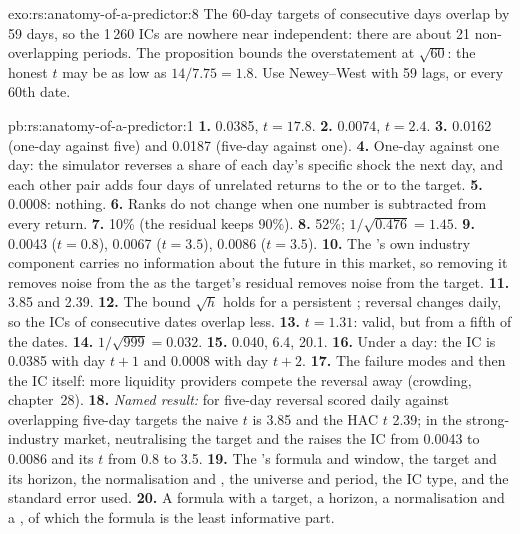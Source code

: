 \begin{solution}{exo:rs:anatomy-of-a-predictor:8}
The 60-day targets of consecutive days overlap by 59 days, so the 1\,260 ICs are nowhere near independent: there are about 21
non-overlapping periods. The proposition bounds the overstatement at $\sqrt{60}$: the honest $t$ may be as low as $14/7.75 = 1.8$. Use
Newey--West with 59 lags, or every 60th date.
\end{solution}

\begin{solution}{pb:rs:anatomy-of-a-predictor:1}
\textbf{1.} 0.0385, $t = 17.8$. \textbf{2.} 0.0074, $t = 2.4$. \textbf{3.} 0.0162 (one-day against five) and 0.0187 (five-day against
one). \textbf{4.} One-day against one day: the simulator reverses a share of each day's specific shock the next day, and each other
pair adds four days of unrelated returns to the  or to the target. \textbf{5.} 0.0008: nothing. \textbf{6.} Ranks do not change
when one number is subtracted from every return. \textbf{7.} 10\% (the residual keeps 90\%). \textbf{8.} 52\%; $1/\sqrt{0.476} = 1.45$.
\textbf{9.} 0.0043 ($t = 0.8$), 0.0067 ($t = 3.5$), 0.0086 ($t = 3.5$). \textbf{10.} The 's own industry component carries no
information about the future in this market, so removing it removes noise from the  as the target's residual removes noise
from the target. \textbf{11.} 3.85 and 2.39. \textbf{12.} The bound $\sqrt h$ holds for a persistent ; reversal changes daily, so
the ICs of consecutive dates overlap less. \textbf{13.} $t = 1.31$: valid, but from a fifth of the dates. \textbf{14.} $1/\sqrt{999} =
0.032$. \textbf{15.} 0.040, 6.4, 20.1. \textbf{16.} Under a day: the IC is 0.0385 with day $t+1$ and 0.0008 with day $t+2$.
\textbf{17.} The failure modes and then the IC itself: more liquidity providers compete the reversal away (crowding, chapter~28).
\textbf{18.} \emph{Named result:} for five-day reversal scored daily against overlapping five-day targets the naive $t$ is 3.85 and the
HAC $t$ 2.39; in the strong-industry market, neutralising the target and the  raises the IC from 0.0043 to 0.0086 and its $t$
from 0.8 to 3.5. \textbf{19.} The 's formula and window, the target and its horizon, the normalisation and ,
the universe and period, the IC type, and the standard error used. \textbf{20.} A formula with a target, a horizon, a normalisation and
a , of which the formula is the least informative part.
\end{solution}

